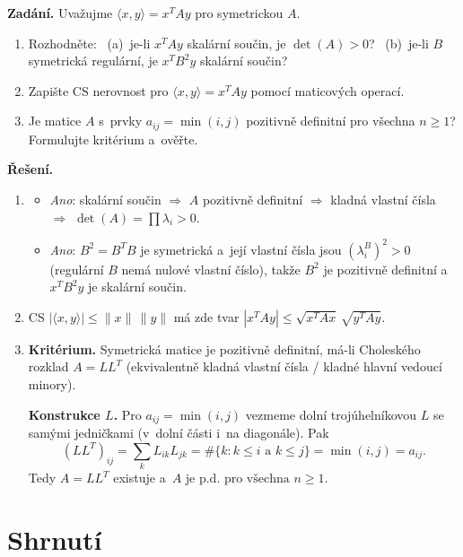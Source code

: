 \documentclass[11pt,a4paper]{article}
\begin{document}
\begin{priklad} \par
\textbf{Zadání.}
Uvažujme $\langle x,y\rangle=x^TAy$ pro symetrickou $A$.
\begin{enumerate}[label=(\arabic*)]
  \item Rozhodněte: \ (a)~je-li $x^TAy$ skalární součin, je $\det(A)>0$? \ (b)~je-li $B$ symetrická regulární, je $x^TB^2y$ skalární součin?
  \item Zapište CS nerovnost pro $\langle x,y\rangle=x^TAy$ pomocí maticových operací.
  \item Je matice $A$ s~prvky $a_{ij}=\min(i,j)$ pozitivně definitní pro všechna $n\ge1$? Formulujte kritérium a~ověřte.
\end{enumerate}
\textbf{Řešení.}
\begin{enumerate}[label=(\arabic*)]
  \item \begin{itemize}
      \item[(a)] \emph{Ano}: skalární součin $\Rightarrow$ $A$ pozitivně definitní $\Rightarrow$ kladná vlastní čísla $\Rightarrow$ $\det(A)=\prod\lambda_i>0$.
      \item[(b)] \emph{Ano}: $B^2=B^TB$ je symetrická a~její vlastní čísla jsou $(\lambda_i^B)^2>0$ (regulární $B$ nemá nulové vlastní číslo), takže $B^2$ je pozitivně definitní a~$x^TB^2y$ je skalární součin.
    \end{itemize}
  \item CS $|\langle x,y\rangle|\le\|x\|\,\|y\|$ má zde tvar $|x^TAy|\le\sqrt{x^TAx}\,\sqrt{y^TAy}$.
  \item \textbf{Kritérium.} Symetrická matice je pozitivně definitní, má-li Choleského rozklad $A=LL^T$ (ekvivalentně kladná vlastní čísla / kladné hlavní vedoucí minory).\par
    \textbf{Konstrukce $L$.} Pro $a_{ij}=\min(i,j)$ vezmeme dolní trojúhelníkovou $L$ se samými jedničkami (v~dolní části i~na diagonále). Pak
    \[ (LL^T)_{ij}=\sum_k L_{ik}L_{jk}=\#\{k:k\le i\text{ a }k\le j\}=\min(i,j)=a_{ij}. \]
    Tedy $A=LL^T$ existuje a~$\boxed{A\text{ je p.d.\ pro všechna }n\ge1}$.
\end{enumerate}
\end{priklad}

\section*{Shrnutí}
\end{document}
